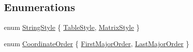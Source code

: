 \subsection*{Enumerations}
\begin{DoxyCompactItemize}
\item 
enum \hyperlink{namespaceandres_a69f07c437d156c7028c7d619e566281f}{String\+Style} \{ \hyperlink{namespaceandres_a69f07c437d156c7028c7d619e566281fa162a419d5299010966e7cc6a74e7b014}{Table\+Style}, 
\hyperlink{namespaceandres_a69f07c437d156c7028c7d619e566281fa8b1efd8fc40539ba5b5255b46440eeaf}{Matrix\+Style}
 \}
\item 
enum \hyperlink{namespaceandres_a2ac8b7aa89d44e8188a7c0ba50f4306b}{Coordinate\+Order} \{ \hyperlink{namespaceandres_a2ac8b7aa89d44e8188a7c0ba50f4306ba88e74e8570fc8b1bee29f708f391fe69}{First\+Major\+Order}, 
\hyperlink{namespaceandres_a2ac8b7aa89d44e8188a7c0ba50f4306ba586bd03d7519be47cac8605d4833b7ae}{Last\+Major\+Order}
 \}
\end{DoxyCompactItemize}

